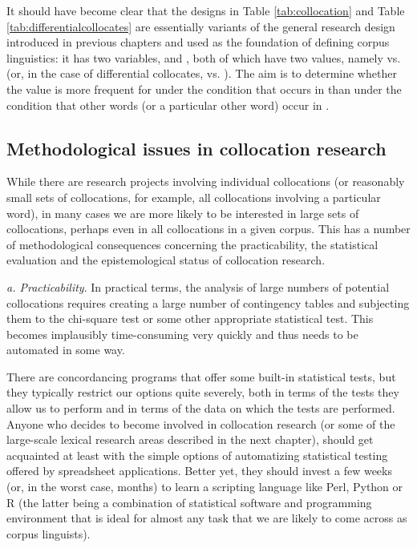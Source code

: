 It should have become clear that the designs in Table \ref{tab:collocation} and Table \ref{tab:differentialcollocates} are essentially variants of the general research design introduced in previous chapters and used as the foundation of defining corpus linguistics: it has two variables,  and , both of which have two values, namely  vs.  (or, in the case of differential collocates,  vs. ). The aim is to determine whether the value  is more frequent for  under the condition that  occurs in  than under the condition that other words (or a particular other word) occur in .

\subsection{Methodological issues in collocation research}
\label{sec:methodologicalissuesincollocationresearch}

While there are research projects involving individual collocations (or reasonably small sets of collocations, for example, all collocations involving a particular word), in many cases we are more likely to be interested in large sets of collocations, perhaps even in all collocations in a given corpus. This has a number of methodological consequences concerning the practicability, the statistical evaluation and the epistemological status of collocation research. 

\textit{a. Practicability}. In practical terms, the analysis of large numbers of potential collocations requires creating a large number of contingency tables and subjecting them to the chi-square test or some other appropriate statistical test. This becomes implausibly time-consuming very quickly and thus needs to be automated in some way.

There are concordancing programs that offer some built-in statistical tests, but they typically restrict our options quite severely, both in terms of the tests they allow us to perform and in terms of the data on which the tests are performed. Anyone who decides to become involved in collocation research (or some of the large-scale lexical research areas described in the next chapter), should get acquainted at least with the simple options of automatizing statistical testing offered by spreadsheet applications. Better yet, they should invest a few weeks (or, in the worst case, months) to learn a scripting language like Perl, Python or R (the latter being a combination of statistical software and programming environment that is ideal for almost any task that we are likely to come across as corpus linguists).

